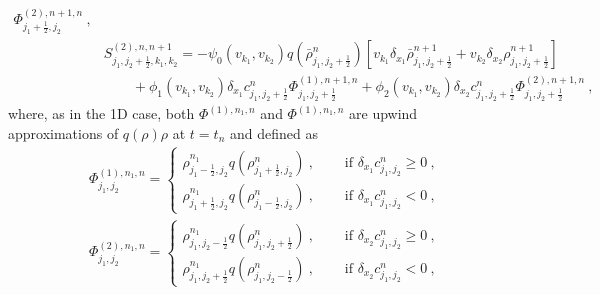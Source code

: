 \documentclass[review,onefignum,onetabnum]{siamart220329}
\begin{document}
\begin{align*}
    \Phi^{(2),n+1,n}_{j_1+\frac12,j_2}
    \ ,\\
    & S_{j_1, j_2+\frac12, k_1, k_2}^{(2), n, n+1} = -\psi_{0}(v_{k_1}, v_{k_2})q( \bar{{\rho}}_{j_1,j_2+\frac12}^n)  \left[v_{k_1} \delta_{x_1} \bar{\rho}_{j_1, j_2+\frac12}^{n+1} + v_{k_2} \delta_{x_2} \rho_{j_1, j_2+\frac12}^{n+1} \right] \\
    & \qquad  + \phi_{1}(v_{k_1}, v_{k_2})\delta_{x_1} c_{j_1,j_2+\frac12}^n\Phi^{(1),n+1,n}_{j_1,j_2+\frac12} +\phi_{2}(v_{k_1}, v_{k_2}) \delta_{x_2} c_{j_1,j_2+\frac12}^n 
    \Phi^{(2),n+1,n}_{j_1,j_2+\frac12}
    \ ,
\end{align*}
where, as in the 1D case, both $\Phi^{(1), n_1,n}$ and $\Phi^{(1), n_1,n}$ are upwind approximations of $q(\rho)\rho$ at $t=t_n$ and defined as 
\begin{align*}
    & \Phi^{(1), n_1,n}_{j_1, j_2} = 
	\begin{cases}
		\rho_{j_1 - \frac12,j_2}^{n_1} q(\rho_{j_1+\frac12,j_2}^n)\ , \quad & \text{ if } \delta_{x_1} c_{j_1,j_2}^n \ge 0\ , \\
		\rho_{j_1+\frac12,j_2}^{n_1} q(\rho_{j_1-\frac12,j_2}^n)\ , \quad & \text{ if } \delta_{x_1} c_{j_1,j_2}^n <0\ , 
	\end{cases}\\
	& \Phi^{(2), n_1,n}_{j_1, j_2} = 
	\begin{cases}
		\rho_{j_1,j_2 - \frac12}^{n_1} q(\rho_{j_1,j_2+\frac12}^n)\ , \quad & \text{ if } \delta_{x_2} c_{j_1,j_2}^n \ge 0\ , \\
		\rho_{j_1,j_2+\frac12}^{n_1} q(\rho_{j_1,j_2-\frac12}^n)\ , \quad & \text{ if } \delta_{x_2} c_{j_1,j_2}^n <0\ ,
	\end{cases}
\end{align*}
\end{document}

